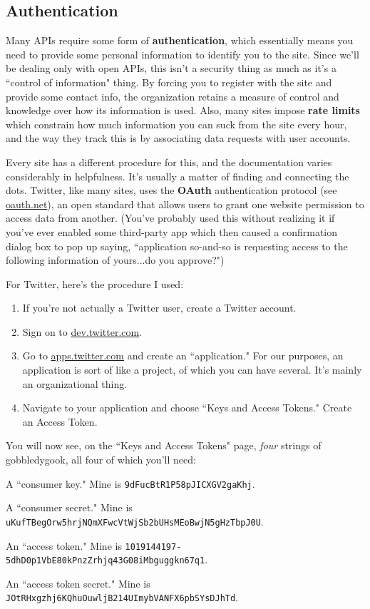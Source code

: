 \documentclass[12pt]{article}
\begin{document}
\subsection{Authentication}

Many APIs require some form of \textbf{authentication}, which essentially
means you need to provide some personal information to identify you to the
site. Since we'll be dealing only with open APIs, this isn't a security thing
as much as it's a ``control of information" thing. By forcing you to register
with the site and provide some contact info, the organization retains a
measure of control and knowledge over how its information is used. Also, many
sites impose \textbf{rate limits} which constrain how much information you can
suck from the site every hour, and the way they track this is by associating
data requests with user accounts.

Every site has a different procedure for this, and the documentation varies
considerably in helpfulness. It's usually a matter of finding and connecting
the dots. Twitter, like many sites, uses the \textbf{OAuth} authentication
protocol (see \url{oauth.net}), an open standard that allows users to grant
one website permission to access data from another. (You've probably used this
without realizing it if you've ever enabled some third-party app which then
caused a confirmation dialog box to pop up saying, ``application so-and-so is
requesting access to the following information of yours...do you approve?")

For Twitter, here's the procedure I used:

\begin{enumerate}
\itemsep.1em
\item If you're not actually a Twitter user, create a Twitter account.
\item Sign on to \url{dev.twitter.com}.
\item Go to \url{apps.twitter.com} and create an ``application." For our
purposes, an application is sort of like a project, of which you can have
several. It's mainly an organizational thing.
\item Navigate to your application and choose ``Keys and Access Tokens."
Create an Access Token.
\end{enumerate}

You will now see, on the ``Keys and Access Tokens" page, \textit{four} strings
of gobbledygook, all four of which you'll need:

\vspace{.1in}
\small
\begin{compactitem}
\item A ``consumer key." Mine is \texttt{9dFucBtR1P58pJICXGV2gaKhj}.
\item A ``consumer secret." Mine is
\texttt{uKufTBegOrw5hrjNQmXFwcVtWjSb2bUHsMEoBwjN5gHzTbpJ0U}.
\item An ``access token." Mine is
\texttt{1019144197-5dhD0p1VbE80kPnzZrhjq43G08iMbguggkn67q1}.
\item An ``access token secret." Mine is
\texttt{JOtRHxgzhj6KQhuOuwljB214UImybVANFX6pbSYsDJhTd}.
\end{compactitem}
\normalsize
\vspace{.1in}
\end{document}
